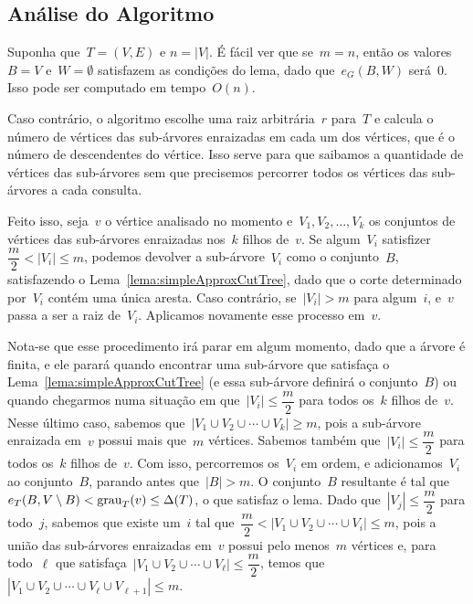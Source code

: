 \bigskip
\bigskip
\bigskip

\subsection*{Análise do Algoritmo}

	Suponha que~$T=(V,E)$ e $n=|V|$.
	É fácil ver que se~$m=n$, então os valores~$B =V$ 
	e~$W =\emptyset$ satisfazem as condições do lema, dado 
	que~$e_G(B,W)$ será~$0$. 
	Isso pode ser computado em tempo~$O(n)$.

	Caso contrário, o algoritmo escolhe uma raiz arbitrária~$r$ 
	para~$T$ e calcula o número de vértices das sub-árvores 
	enraizadas em cada um dos vértices, que é o número de 
	descendentes do vértice.
	Isso serve para que saibamos a quantidade de vértices das 
	sub-árvores sem que precisemos percorrer todos os vértices das 
	sub-árvores a cada consulta.

	Feito isso, seja~$v$ o vértice analisado no momento 
	e~${V_1, V_2, \ldots, V_k}$ os conjuntos de vértices das
	sub-árvores enraizadas 
	nos~$k$ filhos de~$v$.
	Se algum~$V_i$ satisfizer~${\dfrac{m}{2}<|V_i|\le m}$, podemos 
	devolver a sub-árvore~$V_i$ como o conjunto~$B$, 
	satisfazendo o Lema~\ref{lema:simpleApproxCutTree}, dado que o
	corte determinado por~$V_i$ contém uma única aresta. 
	Caso contrário, se~${|V_i|>m}$ para algum~$i$, 
	e~$v$ passa a ser a raiz de~$V_i$.
	Aplicamos novamente esse processo em~$v$.

	Nota-se que esse procedimento irá parar em algum momento, dado 
	que a árvore é finita, e ele parará quando encontrar uma 
	sub-árvore que satisfaça o Lema~\ref{lema:simpleApproxCutTree}
	(e essa sub-árvore definirá o conjunto~$B$) 
	ou quando chegarmos numa situação em 
	que~${|V_i|\le \dfrac{m}{2}}$ para todos os~$k$ filhos de~$v$.
	Nesse último caso, sabemos 
	que~${|V_1\cup V_2\cup \cdots \cup V_k|\ge m}$, pois
	a sub-árvore enraizada em~$v$ possui mais que~$m$ vértices. 
	Sabemos também que~${|V_i|\le \dfrac{m}{2}}$ para todos os~$k$ 
	filhos de~$v$. 
	Com isso, percorremos os~$V_i$ em ordem, e 
	adicionamos~$V_i$ ao conjunto~$B$, parando antes 
	que~${|B| >m}$. 
	O conjunto~$B$ resultante é tal 
	que~${e_T(B,V\setminus B)<\mathrm{grau}_T(v)\le \Delta(T)}$, 
	o que satisfaz o lema.
	Dado que~${|V_j|\le \dfrac{m}{2}}$ para todo~$j$, sabemos que 
	existe um~$i$ tal 
	que~${\dfrac{m}{2} <|V_1\cup V_2 \cup \cdots \cup V_i|\le m}$, 
	pois a união das sub-árvores enraizadas em~$v$ possui pelo 
	menos~$m$ vértices e, para todo~$\ell$ que 
	satisfaça~${|V_1\cup V_2\cup \cdots\cup V_\ell|\le 
	\dfrac{m}{2}}$, temos 
	que~${|V_1\cup V_2\cup\cdots\cup V_\ell\cup V_{\ell+1}|\le m}$.


